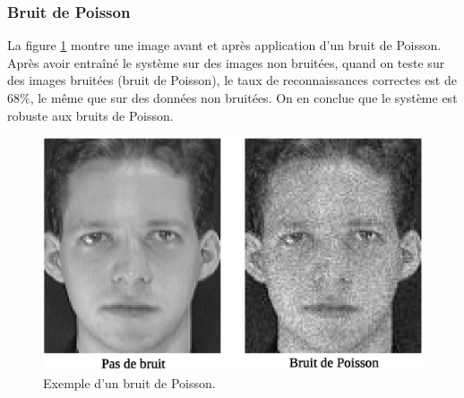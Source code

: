 \subsubsection{Bruit de Poisson}
La figure \ref{fig:robustness:poisson} montre une image avant et après application d'un bruit de Poisson.
Après avoir entraîné le système sur des images non bruitées, quand on teste sur des images
bruitées (bruit de Poisson), le taux de reconnaissances correctes est de $68\%$, le même que
sur des données non bruitées. On en conclue que le système est robuste aux bruits de Poisson.
\begin{figure}[H]
    \centering
    \includegraphics[scale=0.6]{images/exemple_poisson}
    \caption{Exemple d'un bruit de Poisson.}
    \label{fig:robustness:poisson}
\end{figure}

